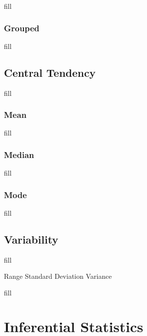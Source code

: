 \documentclass[
  b5paper]{book}
\begin{document}
fill

\hypertarget{grouped}{%
\subsubsection*{Grouped}\label{grouped}}

fill

\hypertarget{central-tendency}{%
\subsection*{Central Tendency}\label{central-tendency}}

fill

\hypertarget{mean}{%
\subsubsection*{Mean}\label{mean}}

fill

\hypertarget{median}{%
\subsubsection*{Median}\label{median}}

fill

\hypertarget{mode}{%
\subsubsection*{Mode}\label{mode}}

fill

\hypertarget{variability}{%
\subsection*{Variability}\label{variability}}

fill

Range Standard Deviation Variance

fill

\hypertarget{inferential-statistics}{%
\section{Inferential Statistics}\label{inferential-statistics}}
\end{document}
